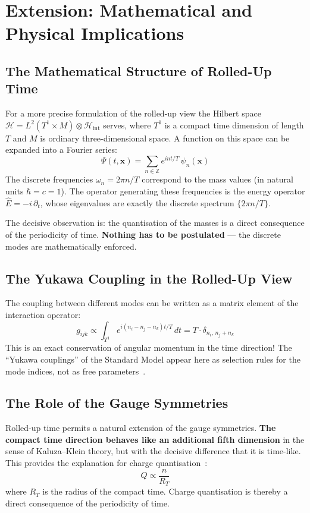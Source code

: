 \documentclass[11pt,a4paper]{article}
\begin{document}
\section{Extension: Mathematical and Physical Implications}

\subsection{The Mathematical Structure of Rolled-Up Time}

For a more precise formulation of the rolled-up view the Hilbert space $\mathcal{H} = L^2(T^1 \times M) \otimes \mathcal{H}_{\text{int}}$ serves, where $T^1$ is a compact time dimension of length $T$ and $M$ is ordinary three-dimensional space. A function on this space can be expanded into a Fourier series:
\[
 \Psi(t, \mathbf{x}) = \sum_{n \in \mathbb{Z}} e^{i n t / T}\, \psi_n(\mathbf{x})
\]
The discrete frequencies $\omega_n = 2\pi n / T$ correspond to the mass values (in natural units $\hbar = c = 1$). The operator generating these frequencies is the energy operator $\hat{E} = -i\,\partial_t$, whose eigenvalues are exactly the discrete spectrum $\{2\pi n / T\}$.

The decisive observation is: the quantisation of the masses is a direct consequence of the periodicity of time. \textbf{Nothing has to be postulated} --- the discrete modes are mathematically enforced.

\subsection{The Yukawa Coupling in the Rolled-Up View}

The coupling between different modes can be written as a matrix element of the interaction operator:
\[
 g_{ijk} \propto \int_{T^1} e^{i(n_i - n_j - n_k)t/T}\, dt = T \cdot \delta_{n_i,\, n_j + n_k}
\]
This is an exact conservation of angular momentum in the time direction! The ``Yukawa couplings'' of the Standard Model appear here as selection rules for the mode indices, not as free parameters~\cite{Weinberg1995}.

\subsection{The Role of the Gauge Symmetries}

Rolled-up time permits a natural extension of the gauge symmetries. \textbf{The compact time direction behaves like an additional fifth dimension} in the sense of Kaluza--Klein theory, but with the decisive difference that it is time-like. This provides the explanation for charge quantisation~\cite{Kaluza1921,Klein1926}:
\[
 Q \propto \frac{n}{R_T}
\]
where $R_T$ is the radius of the compact time. Charge quantisation is thereby a direct consequence of the periodicity of time.
\end{document}
